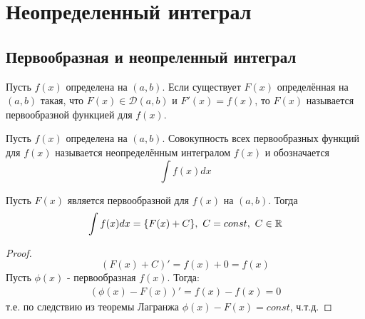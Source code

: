\section{Неопределенный интеграл}
\subsection{Первообразная и неопреленный интеграл}
\begin{definition}
    Пусть $f(x)$ определена на $(a, b)$. Если существует $F(x)$ определённая на $(a, b)$ такая, что $F(x) \in \mathcal{D}(a, b)$ и $F'(x) = f(x)$, то $F(x)$ называется первообразной функцией для $f(x)$.
\end{definition}
\begin{definition}
    Пусть $f(x)$ определена на $(a, b)$. Совокупность всех первообразных функций для $f(x)$ называется неопределённым интегралом $f(x)$ и обозначается 
    \[\int f(x)dx\]
\end{definition}
\begin{theorem}
    Пусть $F(x)$ является первообразной для $f(x)$ на $(a, b)$. Тогда
    \[\int f(x)dx = \{F(x) + C\},\ C = const, \ C\in\mathbb{R}\]
\end{theorem}
\begin{proof}
    \[(F(x) + C)' = f(x) + 0 = f(x)\]
    Пусть $\phi(x)$ -  первообразная $f(x)$. Тогда:
    \begin{align*}
        (\phi(x) - F(x))' = f(x) - f(x) = 0
    \end{align*}
    т.е. по следствию из теоремы Лагранжа $\phi(x) - F(x) = const$, ч.т.д.
\end{proof}
